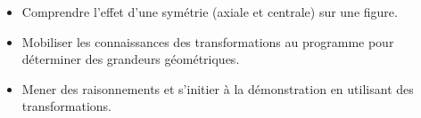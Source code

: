 \begin{prerequis}    
    \begin{itemize}        
        \item[\emoji{diamond-suit}] Comprendre l’effet d’une symétrie (axiale et centrale) sur une figure.
        \item[\emoji{diamond-suit}] Mobiliser les connaissances des transformations au programme pour déterminer des grandeurs géométriques.
        \item[\emoji{diamond-suit}] Mener des raisonnements et s’initier à la démonstration en utilisant des transformations.
    \end{itemize}
\end{prerequis}